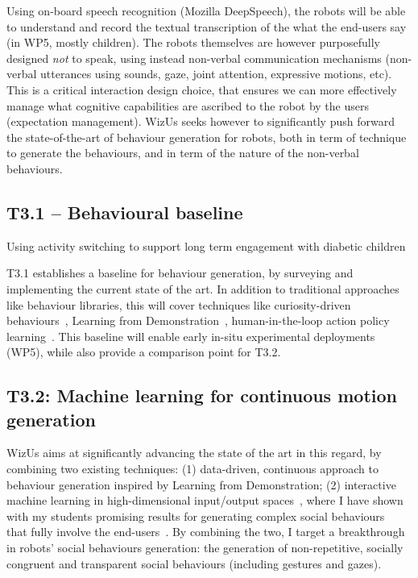 \documentclass[11pt,a4paper]{report}
\newcommand{\project}{WizUs\xspace}
\begin{document}
Using on-board speech recognition (Mozilla DeepSpeech), the robots will be able to understand and
record the textual transcription of the what the end-users say (in WP5, mostly
children). The robots themselves are however purposefully designed \emph{not} to
speak, using instead non-verbal communication mechanisms (non-verbal utterances
using sounds, gaze, joint attention, expressive motions, etc). This is a
critical interaction design choice, that ensures we can more effectively manage
what cognitive capabilities are ascribed to the robot by the users (expectation
management).  \project seeks however to significantly push forward the
state-of-the-art of behaviour generation for robots, both in term of technique to
generate the behaviours, and in term of the nature of the non-verbal behaviours.


\subsection{T3.1 -- Behavioural baseline}


Using activity switching to support long term engagement with diabetic children~\cite{coninx2016towards}

T3.1 establishes a baseline for behaviour
generation, by surveying and implementing the current state of the art. In
addition to traditional approaches like behaviour libraries, this will cover
techniques like curiosity-driven behaviours~\cite{oudeyer2005playground},
Learning from Demonstration~\cite{billard2008robot, argall2009survey},
human-in-the-loop action policy learning~\cite{senft2016sparc,
senft2019teaching}. This baseline will enable early in-situ experimental
deployments (WP5), while also provide a comparison point for T3.2.

\subsection{T3.2: Machine learning for continuous motion generation}

\project aims
at significantly advancing the state of the art in this regard, by combining two
existing techniques: (1) data-driven, continuous approach to behaviour
generation inspired by Learning from Demonstration; (2) interactive machine
learning in high-dimensional input/output spaces~\cite{senft2020woz}, where I
have shown with my students promising results for generating complex social
behaviours~\cite{senft2019teaching, winkle2020couch} that fully involve the
end-users~\cite{winkle2018social}.  By combining the two, I target
a breakthrough in robots' social behaviours generation: the generation of
non-repetitive, socially congruent and transparent social behaviours (including
gestures and gazes).
\end{document}
